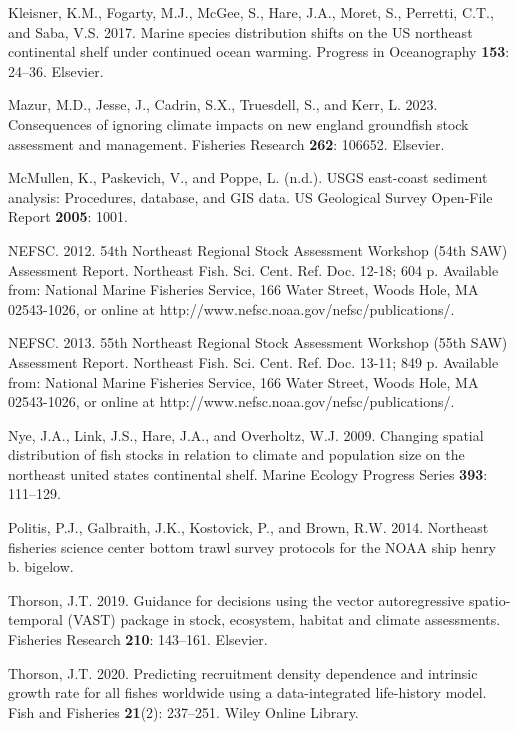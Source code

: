 \documentclass[
  12pt,
]{article}
\newlength{\cslhangindent}
\newlength{\cslentryspacingunit} %
\newenvironment{CSLReferences}[2] %
 {%
  \setlength{\parindent}{0pt}
  \ifodd #1
  \let\oldpar\par
  \def\par{\hangindent=\cslhangindent\oldpar}
  \fi
  \setlength{\parskip}{#2\cslentryspacingunit}
 }%
 {}
\begin{document}
\begin{CSLReferences}{1}{0}
\leavevmode{}%
Kleisner, K.M., Fogarty, M.J., McGee, S., Hare, J.A., Moret, S., Perretti, C.T., and Saba, V.S. 2017. Marine species distribution shifts on the US northeast continental shelf under continued ocean warming. Progress in Oceanography \textbf{153}: 24--36. Elsevier.

\leavevmode{}%
Mazur, M.D., Jesse, J., Cadrin, S.X., Truesdell, S., and Kerr, L. 2023. Consequences of ignoring climate impacts on new england groundfish stock assessment and management. Fisheries Research \textbf{262}: 106652. Elsevier.

\leavevmode{}%
McMullen, K., Paskevich, V., and Poppe, L. (n.d.). USGS east-coast sediment analysis: Procedures, database, and GIS data. US Geological Survey Open-File Report \textbf{2005}: 1001.

\leavevmode{}%
NEFSC. 2012. {54th Northeast Regional Stock Assessment Workshop (54th SAW) Assessment Report}. {Northeast Fish. Sci. Cent. Ref. Doc. 12-18; 604 p. Available from: National Marine Fisheries Service, 166 Water Street, Woods Hole, MA 02543-1026, or online at http://www.nefsc.noaa.gov/nefsc/publications/}.

\leavevmode{}%
NEFSC. 2013. {55th Northeast Regional Stock Assessment Workshop (55th SAW) Assessment Report}. {Northeast Fish. Sci. Cent. Ref. Doc. 13-11; 849 p. Available from: National Marine Fisheries Service, 166 Water Street, Woods Hole, MA 02543-1026, or online at http://www.nefsc.noaa.gov/nefsc/publications/}.

\leavevmode{}%
Nye, J.A., Link, J.S., Hare, J.A., and Overholtz, W.J. 2009. Changing spatial distribution of fish stocks in relation to climate and population size on the northeast united states continental shelf. Marine Ecology Progress Series \textbf{393}: 111--129.

\leavevmode{}%
Politis, P.J., Galbraith, J.K., Kostovick, P., and Brown, R.W. 2014. Northeast fisheries science center bottom trawl survey protocols for the NOAA ship henry b. bigelow.

\leavevmode{}%
Thorson, J.T. 2019. Guidance for decisions using the vector autoregressive spatio-temporal (VAST) package in stock, ecosystem, habitat and climate assessments. Fisheries Research \textbf{210}: 143--161. Elsevier.

\leavevmode{}%
Thorson, J.T. 2020. Predicting recruitment density dependence and intrinsic growth rate for all fishes worldwide using a data-integrated life-history model. Fish and Fisheries \textbf{21}(2): 237--251. Wiley Online Library.

\end{CSLReferences}
\end{document}
